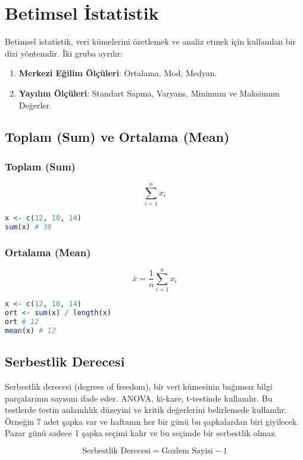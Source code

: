 \section{Betimsel İstatistik}
Betimsel istatistik, veri kümelerini özetlemek ve analiz etmek için kullanılan bir dizi yöntemdir. İki gruba ayrılır:
\begin{enumerate}
	\item \textbf{Merkezi Eğilim Ölçüleri}: Ortalama, Mod, Medyan.
	\item \textbf{Yayılım Ölçüleri}: Standart Sapma, Varyans, Minimum ve Maksimum Değerler.
\end{enumerate}

\subsection{Toplam (Sum) ve Ortalama (Mean)}
\subsubsection{Toplam (Sum)}

\[
\sum_{i=1}^{n} x_i
\]

\begin{lstlisting}[language=R]
x <- c(12, 10, 14)
sum(x) # 36
\end{lstlisting}

\subsubsection{Ortalama (Mean)}

\[
\bar{x} = \frac{1}{n} \sum_{i=1}^{n} x_i
\]

\begin{lstlisting}[language=R]
x <- c(12, 10, 14)
ort <- sum(x) / length(x)
ort # 12
mean(x) # 12
\end{lstlisting}

\subsection{Serbestlik Derecesi}
Serbestlik derecesi (degrees of freedom), bir veri kümesinin bağımsız bilgi parçalarının sayısını ifade eder. ANOVA, ki-kare, t-testinde kullanılır. Bu testlerde testin anlamlılık düzeyini ve kritik değerlerini belirlemede kullanılır. Örneğin 7 adet şapka var ve haftanın her bir günü bu şapkalardan biri giyilecek. Pazar günü sadece 1 şapka seçimi kalır ve bu seçimde bir serbestlik olmaz.

\[
\text{Serbestlik Derecesi} = \text{Gozlem Sayisi} - 1
\]

